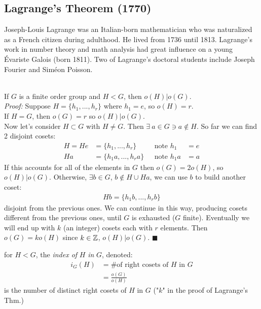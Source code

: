 \subsection{Lagrange's Theorem (1770)} 
Joseph-Louis Lagrange was an Italian-born mathematician who was naturalized as a French citizen during adulthood. He lived from 1736 until 1813. Lagrange's work in number theory and math analysis had great influence on a young \'Evariste Galois (born 1811). Two of Lagrange's doctoral students include Joseph Fourier and Sim\'eon Poisson.
\setcounter{dummy}{0}
\begin{theorem} \hspace{0.1in}\steezybreak\\
If $G$ is a finite order group and $H<G$, then $o(H)|o(G)$.\steezybreak\\
\textit{Proof:} Suppose $H=\{h_1,...,h_r\}$ where $h_1=e$, so $o(H)=r$. \\
If $H=G$, then $o(G)=r$ so $o(H)|o(G)$.\\
Now let's consider $H\subset G$ with $H\neq G$. Then $\exists \ a\in G\ni a\not \in H$. So far we can find 2 disjoint cosets:
\begin{align}
    H=He&=\{h_1,...,h_r\}  \ \ \ \ \ &\text{note }h_1&=e\nonumber \\
    Ha&=\{h_1a,...,h_ra\} \ \ \ &\text{note }h_1a&=a\nonumber
\end{align}
If this accounts for all of the elements in $G$ then $o(G)=2o(H)$, so $o(H)|o(G)$. Otherwise, $\exists b \in G$, $b\not \in H\cup Ha$, we can use $b$ to build another coset:
\begin{align}
    Hb=\{h_1b,...,h_rb\}\nonumber
\end{align}
disjoint from the previous ones. We can continue in this way, producing cosets different from the previous ones, until $G$ is exhausted ($G$ finite). Eventually we will end up with $k$ (an integer) cosets each with $r$ elements. Then $o(G)=k o(H)$ since $k\in {\mathbb{ Z}}$, $o(H)|o(G)$. $\blacksquare$
\end{theorem}
\begin{definition}
for $H<G$, the \textit{index of} $H$ \textit{in} $G$, denoted:
\begin{align}
    i_G(H) &= \text{\# of right cosets of }H \text{ in } G \nonumber \\
    &= \frac{o(G)}{o(H)} \nonumber
\end{align}
is the number of distinct right cosets of $H$ in $G$ ("$k$" in the proof of Lagrange's Thm.)
\end{definition}
